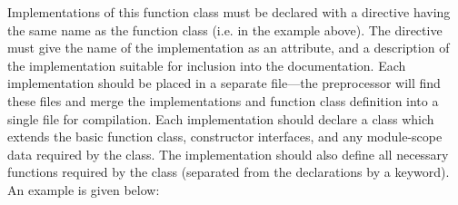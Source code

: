 Implementations of this function class must be declared with a directive having the same name as the function class (i.e.  in the example above). The directive must give the name of the implementation as an attribute, and a description of the implementation suitable for inclusion into the documentation. Each implementation should be placed in a separate file---the preprocessor will find these files and merge the implementations and function class definition into a single file for compilation. Each implementation should declare a class which extends the basic function class, constructor interfaces, and any module-scope data required by the class. The implementation should also define all necessary functions required by the class (separated from the declarations by a  keyword). An example is given below:

